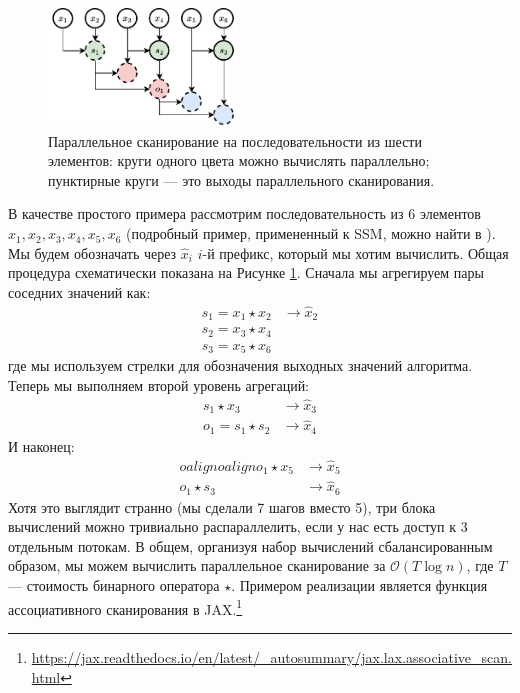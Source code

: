 \begin{figure}
    \centering
    \hspace{1em}\includegraphics[width=0.45\textwidth]{images/associative_scan}
    \caption{Параллельное сканирование на последовательности из шести элементов: круги одного цвета можно вычислять параллельно; пунктирные круги — это выходы параллельного сканирования.}
    \label{fig:associative_scan}
\end{figure}

В качестве простого примера рассмотрим последовательность из 6 элементов $x_1,x_2,x_3, x_4, x_5, x_6$ (подробный пример, примененный к SSM, можно найти в \cite{smith2022simplified}). Мы будем обозначать через $\hat{x}_i$ $i$-й префикс, который мы хотим вычислить. Общая процедура схематически показана на Рисунке \ref{fig:associative_scan}. Сначала мы агрегируем пары соседних значений как:
%
\begin{align*}
s_1 = x_1 \star x_2  & \rightarrow\hat{x}_2 \\s_2 = x_3 \star x_4 &\\ s_3 = x_5 \star x_6 &
\end{align*}
%
где мы используем стрелки для обозначения выходных значений алгоритма. Теперь мы выполняем второй уровень агрегаций:
%
\begin{align*}
s_1 \star x_3 & \rightarrow \hat{x}_3 \\o_1 = s_1 \star s_2 & \rightarrow \hat{x}_4
\end{align*}
%
И наконец:
%
\begin{align*} 
oalign{
}
oalign{
}o_1 \star x_5 & \rightarrow \hat{x}_5 \\ o_1 \star s_3 & \rightarrow \hat{x}_6
\end{align*}
%
Хотя это выглядит странно (мы сделали 7 шагов вместо 5), три блока вычислений можно тривиально распараллелить, если у нас есть доступ к 3 отдельным потокам. В общем, организуя набор вычислений сбалансированным образом, мы можем вычислить параллельное сканирование за $\mathcal{O}(T \log n)$, где $T$ — стоимость бинарного оператора $\star$. Примером реализации является функция ассоциативного сканирования в JAX.\footnote{\url{https://jax.readthedocs.io/en/latest/_autosummary/jax.lax.associative_scan.html}}

